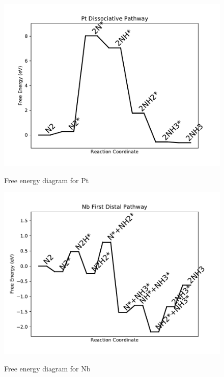 \documentclass{article}
\begin{document}
\begin{figure}
\includegraphics[width=1\linewidth]{data/plots/Pt_dissociative.pdf}
\label{fig:Pt_dissociative}
\caption{Free energy diagram for Pt}
\end{figure}

\clearpage
\begin{figure}
\includegraphics[width=1\linewidth]{data/plots/Nb_distal_1.pdf}
\label{fig:Nb_distal_1}
\caption{Free energy diagram for Nb}
\end{figure}
\end{document}
